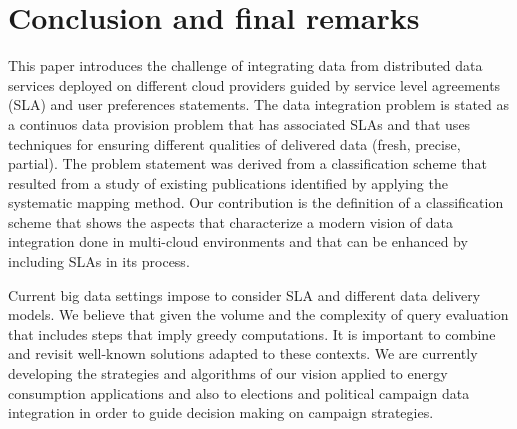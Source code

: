 \documentclass{llncs}
\begin{document}
\section{Conclusion and final remarks}\label{sec:conc}
This paper introduces the challenge of integrating data from distributed data services deployed on different cloud providers guided by service level agreements (SLA) and user preferences statements. The data integration problem is stated as a continuos data provision problem that has associated SLAs and that uses techniques for ensuring different qualities of delivered data (fresh, precise, partial). The problem statement was derived from a classification scheme that resulted from a study of existing publications identified by applying the systematic mapping method. Our contribution is the definition of a classification scheme that shows the aspects that characterize a modern vision of data integration done in multi-cloud environments and that can be enhanced by including SLAs in its process.  

Current big data settings impose to consider SLA and different data delivery models. We believe that given the volume and the complexity of query evaluation that includes steps that imply greedy computations. It is important to combine and revisit well-known solutions adapted to these contexts. We are currently developing the strategies and algorithms of our vision  applied to energy consumption applications  and also to elections and political campaign data integration in order to guide decision making on campaign strategies.


\end{document}
